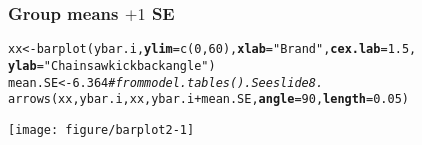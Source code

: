 \documentclass[color=usenames,dvipsnames]{beamer}\usepackage[]{graphicx}\usepackage[]{color}
\makeatletter
\newcommand{\hlnum}[1]{\textcolor[rgb]{0.69,0.494,0}{#1}}%
\newcommand{\hlstr}[1]{\textcolor[rgb]{0.749,0.012,0.012}{#1}}%
\newcommand{\hlcom}[1]{\textcolor[rgb]{0.514,0.506,0.514}{\textit{#1}}}%
\newcommand{\hlopt}[1]{\textcolor[rgb]{0,0,0}{#1}}%
\newcommand{\hlstd}[1]{\textcolor[rgb]{0,0,0}{#1}}%
\newcommand{\hlkwb}[1]{\textcolor[rgb]{0,0.341,0.682}{#1}}%
\newcommand{\hlkwc}[1]{\textcolor[rgb]{0,0,0}{\textbf{#1}}}%
\newcommand{\hlkwd}[1]{\textcolor[rgb]{0.004,0.004,0.506}{#1}}%
\newenvironment{kframe}{%
 \def\at@end@of@kframe{}%
 \ifinner\ifhmode%
  \def\at@end@of@kframe{\end{minipage}}%
  \begin{minipage}{\columnwidth}%
 \fi\fi%
 \def\FrameCommand##1{\hskip\@totalleftmargin \hskip-\fboxsep
 \colorbox{shadecolor}{##1}\hskip-\fboxsep
     \hskip-\linewidth \hskip-\@totalleftmargin \hskip\columnwidth}%
 \MakeFramed {\advance\hsize-\width
   \@totalleftmargin\z@ \linewidth\hsize
   \@setminipage}}%
 {\par\unskip\endMakeFramed%
 \at@end@of@kframe}
\newenvironment{knitrout}{}{} %
\makeatother
\begin{document}
\begin{frame}[fragile]
  \frametitle{Group means $+1$ SE}
\begin{knitrout}\scriptsize
{}\color{fgcolor}\begin{kframe}
\begin{alltt}
\hlstd{xx} \hlkwb{<-} \hlkwd{barplot}\hlstd{(ybar.i,} \hlkwc{ylim}\hlstd{=}\hlkwd{c}\hlstd{(}\hlnum{0}\hlstd{,} \hlnum{60}\hlstd{),} \hlkwc{xlab}\hlstd{=}\hlstr{"Brand"}\hlstd{,} \hlkwc{cex.lab}\hlstd{=}\hlnum{1.5}\hlstd{,}
              \hlkwc{ylab}\hlstd{=}\hlstr{"Chainsaw kickback angle"}\hlstd{)}
\hlstd{mean.SE} \hlkwb{<-} \hlnum{6.364} \hlcom{# from model.tables(). See slide 8.}
\hlkwd{arrows}\hlstd{(xx, ybar.i, xx, ybar.i}\hlopt{+}\hlstd{mean.SE,} \hlkwc{angle}\hlstd{=}\hlnum{90}\hlstd{,} \hlkwc{length}\hlstd{=}\hlnum{0.05}\hlstd{)}
\end{alltt}
\end{kframe}
\end{knitrout}
\vspace{-.1cm}
\begin{center}
  \texttt{[image: figure/barplot2-1]} %
\end{center}
\end{frame}












\end{document}
